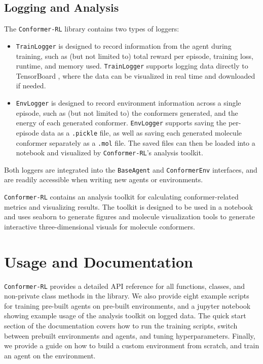 \documentclass[twoside,11pt]{article}
\newcommand{\code}[1]{\texttt{#1}}
\newcommand{\titleofpaper}{Conformer-RL}
\begin{document}
\subsection{Logging and Analysis}
The \code{\titleofpaper} library contains two types of loggers:
\begin{itemize}
  \item \code{TrainLogger} is designed to record information from the agent during training, such as (but not limited to) total reward per episode, training loss, runtime, and memory used. \code{TrainLogger} supports logging data directly to TensorBoard \citep{tensorflow2015-whitepaper}, where the data can be visualized in real time and downloaded if needed.
  \item \code{EnvLogger} is designed to record environment information across a single episode, such as (but not limited to) the conformers generated, and the energy of each generated conformer. \code{EnvLogger} supports saving the per-episode data as a \code{.pickle} file, as well as saving each generated molecule conformer separately as a \code{.mol} file. The saved files can then be loaded into a notebook and visualized by \code{\titleofpaper}'s analysis toolkit.
\end{itemize}
Both loggers are integrated into the \code{BaseAgent} and \code{ConformerEnv} interfaces, and are readily accessible when writing new agents or environments.

\code{\titleofpaper} contains an analysis toolkit for calculating conformer-related metrics and visualizing results. The toolkit is designed to be used in a notebook and uses seaborn \citep{waskom2021seaborn} to generate figures and molecule visualization tools to generate interactive three-dimensional visuals for molecule conformers.

\section{Usage and Documentation}
\code{\titleofpaper} provides a detailed API reference for all functions, classes, and non-private class methods in the library. We also provide eight example scripts for training pre-built agents on pre-built environments, and a jupyter notebook showing example usage of the analysis toolkit on logged data. The quick start section of the documentation covers how to run the training scripts, switch between prebuilt environments and agents, and tuning hyperparameters. Finally, we provide a guide on how to build a custom environment from scratch, and train an agent on the environment.
\end{document}
